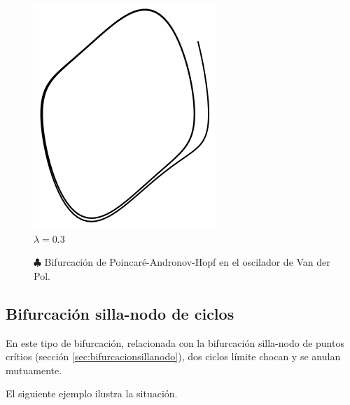 \begin{figure}[!ht]
	\includegraphics[scale=0.35]{figures/vanderpol-hopfbifurcation-0_3.png} \\ $\lambda = 0.3$
	\caption{$\clubsuit$ Bifurcación de Poincaré-Andronov-Hopf en el oscilador de Van der Pol.}
\end{figure}

\subsection{Bifurcación silla-nodo de ciclos}
En este tipo de bifurcación, relacionada con la bifurcación silla-nodo de puntos crítios (sección \ref{sec:bifurcacionsillanodo}), dos ciclos límite chocan y se anulan mutuamente.

El siguiente ejemplo ilustra la situación.


